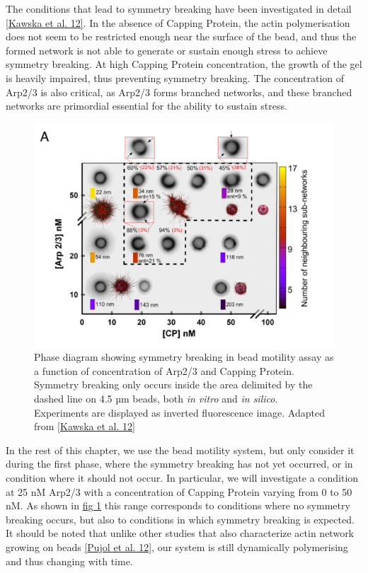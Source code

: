 \documentclass[A4paperpaper,11pt,english]{sphinxmanual}
\begin{document}
The conditions that lead to symmetry breaking have been investigated in detail
{\hyperref[index-latex:kawska2012]{{[}Kawska et al. 12{]}}}. In the absence of Capping Protein, the actin polymerisation
does not seem to be restricted enough near the surface of the bead, and thus the formed
network is not able to generate or sustain enough stress to achieve symmetry
breaking. At high Capping Protein concentration, the growth of the gel is heavily impaired,
thus preventing symmetry breaking. The concentration of Arp2/3 is also critical,
as Arp2/3 forms branched networks, and these branched networks are primordial essential for the
ability to sustain stress.
\begin{figure}[htbp]
\centering
\capstart

\includegraphics[width=0.700\linewidth]{symmetry-breaking-phase-diagram.png}
\caption{Phase diagram showing symmetry breaking in bead motility assay as a
function of concentration of Arp2/3 and Capping Protein. Symmetry breaking
only occurs inside the area delimited by the dashed line on 4.5 µm beads, both
\emph{in vitro} and \emph{in silico}. Experiments are
displayed as inverted fluorescence image. Adapted from {\hyperref[index-latex:kawska2012]{{[}Kawska et al. 12{]}}}}\label{index-latex:phase-diag}\end{figure}

In the rest of this chapter, we use the bead motility system, but only
consider it during the first phase, where the symmetry breaking has not yet
occurred, or in condition where it should not occur. In particular, we will
investigate a condition at 25 nM Arp2/3 with a concentration of Capping Protein
varying from 0 to 50 nM. As shown in \hyperref[index-latex:phase-diag]{fig  \ref*{index-latex:phase-diag}} this range corresponds to
conditions where no symmetry breaking occurs, but also to conditions in which
symmetry breaking is expected.  It should be noted that unlike
other studies that also characterize actin network growing on beads
{\hyperref[index-latex:pujol2012]{{[}Pujol et al. 12{]}}}, our system is still dynamically polymerising and thus
changing with time.
\end{document}
